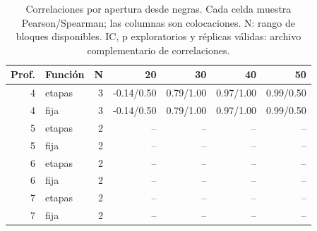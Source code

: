 \begin{table}[htbp]
\centering\small
\caption{Correlaciones por apertura desde negras. Cada celda muestra Pearson/Spearman; las columnas son colocaciones. N: rango de bloques disponibles. IC, p exploratorios y réplicas válidas: archivo complementario de correlaciones.}
\label{tab:othello_correlaciones}
\begin{tabular}{rlrrrrr}
\toprule
Prof. & Función & N & 20 & 30 & 40 & 50 \\
\midrule
4 & etapas & 3 & -0.14/0.50 & 0.79/1.00 & 0.97/1.00 & 0.99/0.50 \\
4 & fija & 3 & -0.14/0.50 & 0.79/1.00 & 0.97/1.00 & 0.99/0.50 \\
5 & etapas & 2 & -- & -- & -- & -- \\
5 & fija & 2 & -- & -- & -- & -- \\
6 & etapas & 2 & -- & -- & -- & -- \\
6 & fija & 2 & -- & -- & -- & -- \\
7 & etapas & 2 & -- & -- & -- & -- \\
7 & fija & 2 & -- & -- & -- & -- \\
\bottomrule
\end{tabular}
\end{table}
